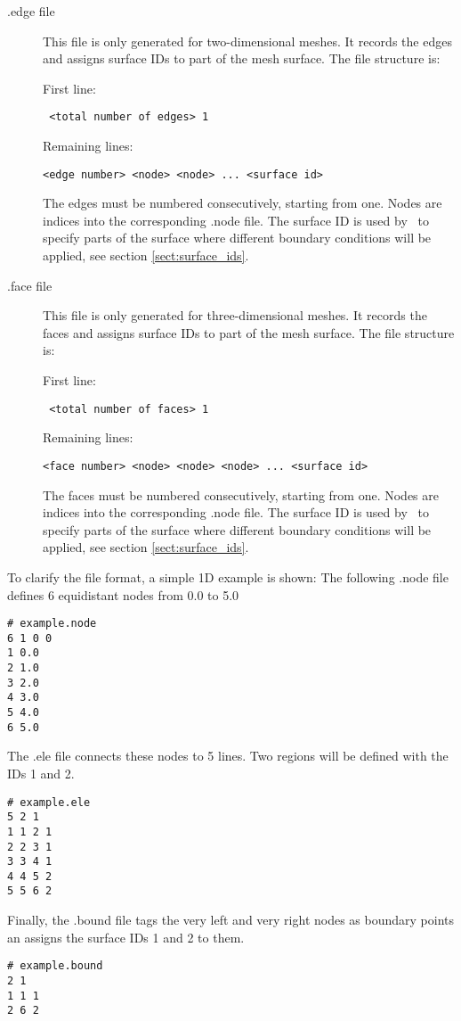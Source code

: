 \begin{description}
\item[.edge file] This file is only generated for two-dimensional meshes.
  It records the edges and assigns surface IDs to part of the mesh surface.
  The file structure is:

First line:
\begin{lstlisting}
 <total number of edges> 1
\end{lstlisting}
Remaining lines:
\begin{lstlisting} 
<edge number> <node> <node> ... <surface id>
\end{lstlisting}  
The edges must be numbered consecutively, starting from one. Nodes are
indices into the corresponding .node file. The surface ID is used by
\fluidity\ to specify parts of the surface where different boundary
conditions will be applied, see section \ref{sect:surface_ids}.


\item[.face file] This file is only generated for three-dimensional meshes.
  It records the faces and assigns surface IDs to part of the mesh surface. The
  file structure is:

First line:
\begin{lstlisting}
 <total number of faces> 1
\end{lstlisting}
Remaining lines:
\begin{lstlisting} 
<face number> <node> <node> <node> ... <surface id>
\end{lstlisting}  
The faces must be numbered consecutively, starting from one. Nodes are
indices into the corresponding .node file. The surface ID is used by
\fluidity\ to specify parts of the surface where different boundary
conditions will be applied, see section \ref{sect:surface_ids}.
\end{description}

To clarify the file format, a simple 1D example is shown: 
The following .node file defines 6 equidistant nodes from 0.0 to 5.0
\begin{lstlisting}
# example.node
6 1 0 0
1 0.0
2 1.0
3 2.0
4 3.0
5 4.0
6 5.0
\end{lstlisting}
The .ele file connects these nodes to 5 lines. Two regions will be defined with the IDs 1 and 2.
\begin{lstlisting}
# example.ele
5 2 1
1 1 2 1
2 2 3 1
3 3 4 1
4 4 5 2
5 5 6 2
\end{lstlisting}
Finally, the .bound file tags the very left and very right nodes as boundary
points an assigns the surface IDs 1 and 2 to them.
\begin{lstlisting}
# example.bound
2 1
1 1 1
2 6 2
\end{lstlisting}

